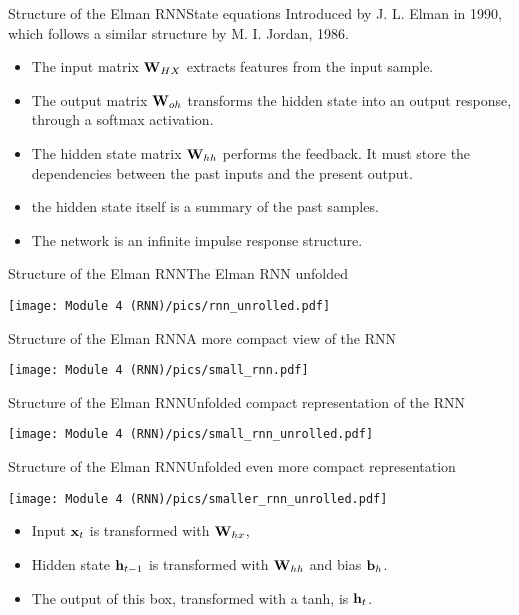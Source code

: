 \documentclass{beamer}
\begin{document}
\begin{frame}{Structure of the Elman RNN}{State equations}
Introduced by J. L. Elman in 1990, which follows a similar structure
 by M. I. Jordan, 1986. 
 \vspace{0.5cm}
    \begin{itemize}
    \item The input matrix ${\bf W}_{HX}$ extracts features from the input sample. 
    \item The output matrix ${\bf W}_{oh}$ transforms the hidden state into an output response, through a softmax activation. 
    \item The hidden state matrix ${\bf W}_{hh}$ performs the feedback. It must store the dependencies between the past inputs and the present output.  
    \item the hidden state itself is a summary of the past samples. 
    \item The network is an infinite impulse response structure. 
    \end{itemize}
\end{frame}

\begin{frame}{Structure of the Elman RNN}{The Elman RNN unfolded}
\begin{center}
    \texttt{[image: Module 4 (RNN)/pics/rnn\_unrolled.pdf]}
    \end{center}
\end{frame}

\begin{frame}{Structure of the Elman RNN}{A more compact view of the RNN}
\begin{center}

    \texttt{[image: Module 4 (RNN)/pics/small\_rnn.pdf]}
    \end{center}
\end{frame}

\begin{frame}{Structure of the Elman RNN}{Unfolded compact representation of the RNN}
\begin{center}
    \texttt{[image: Module 4 (RNN)/pics/small\_rnn\_unrolled.pdf]}
    \end{center}
\end{frame}

\begin{frame}{Structure of the Elman RNN}{Unfolded even more compact representation}
\begin{center}
    \texttt{[image: Module 4 (RNN)/pics/smaller\_rnn\_unrolled.pdf]}
\end{center}
\begin{itemize}
    \item Input ${\bf x}_t$ is transformed with ${\bf W}_{hx}$,
    \item Hidden state ${\bf h}_{t-1}$ is transformed with ${\bf W}_{hh}$ and bias ${\bf b}_h$.
    \item The output of this box, transformed with a tanh, is ${\bf h}_t$. 
    
\end{itemize}
\end{frame}
\end{document}

